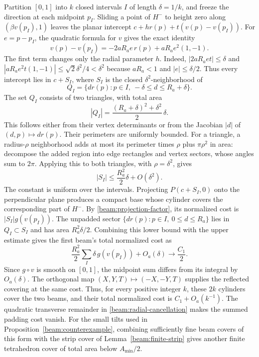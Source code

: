Partition $[0,1]$ into $k$ closed intervals $I$ of length $\delta=1/k$,
and freeze the direction at each midpoint $p_I$. Sliding a point of $H^-$
to height zero along $(\beta v(p_I),1)$ leaves the planar intercept
$c+h r(p)+t(v(p)-v(p_I))$. For $e=p-p_I$, the quadratic formula for $v$
gives the exact identity
\begin{equation}\label{beam:radial-cancellation}
 v(p)-v(p_I)=-2aR_a e\,r(p)+aR_a e^2(1,-1).
\end{equation}
The first term changes only the radial parameter $h$. Indeed,
$|2aR_a et|\le\delta$ and
$|aR_a e^2t(1,-1)|\le\sqrt2\delta^2/4<\delta^2$ because
$aR_a<1$ and $|e|\le\delta/2$. Thus every intercept lies in $c+S_I$,
where $S_I$ is the closed $\delta^2$-neighborhood of
\[
 Q_I=\{d r(p):p\in I,\ -\delta\le d\le R_a+\delta\}.
\]
The set $Q_I$ consists of two triangles, with total area
\[
 |Q_I|=\frac{(R_a+\delta)^2+\delta^2}{2}\,\delta.
\]
This follows either from their vertex determinants or from the Jacobian
$|d|$ of $(d,p)\mapsto d r(p)$. Their perimeters are uniformly bounded.
For a triangle, a radius-$\rho$ neighborhood adds at most its perimeter
times $\rho$ plus $\pi\rho^2$ in area: decompose the added region
into edge rectangles and vertex sectors, whose angles sum to $2\pi$.
Applying this to both triangles,
with $\rho=\delta^2$, gives
\[
 |S_I|\le \frac{R_a^2}{2}\delta+O(\delta^2).
\]
The constant is uniform over the intervals. Projecting $P(c+S_I,0)$ onto
the perpendicular plane produces a compact base whose cylinder covers
the corresponding part of $H^-$. By \eqref{beam:projection-factor}, its normalized cost is
$|S_I|g(v(p_I))$. The unpadded sector
$\{d r(p):p\in I,\ 0\le d\le R_a\}$ lies in $Q_I\subset S_I$
and has area $R_a^2\delta/2$. Combining this lower bound with the
upper estimate gives the first beam's total normalized cost as
\[
 \frac{R_a^2}{2}\sum_I\delta\,g(v(p_I))+O_a(\delta)
 \longrightarrow \frac{C_1}{2}.
\]
Since $g\circ v$ is smooth on $[0,1]$, the midpoint sum differs from
its integral by $O_a(\delta)$. The orthogonal map
$(X,Y,T)\mapsto(-X,-Y,T)$ supplies the reflected covering at the same
cost. Thus, for every positive integer $k$, these $2k$ cylinders cover
the two beams, and their total normalized cost is
$C_1+O_a(k^{-1})$. The quadratic transverse remainder in
\eqref{beam:radial-cancellation} makes the summed padding cost vanish.
For the small tilts used in Proposition~\ref{beam:counterexample},
combining sufficiently fine beam covers of this form with the strip cover
of Lemma~\ref{beam:finite-strip} gives another finite tetrahedron cover
of total area below $A_{\min}/2$.
